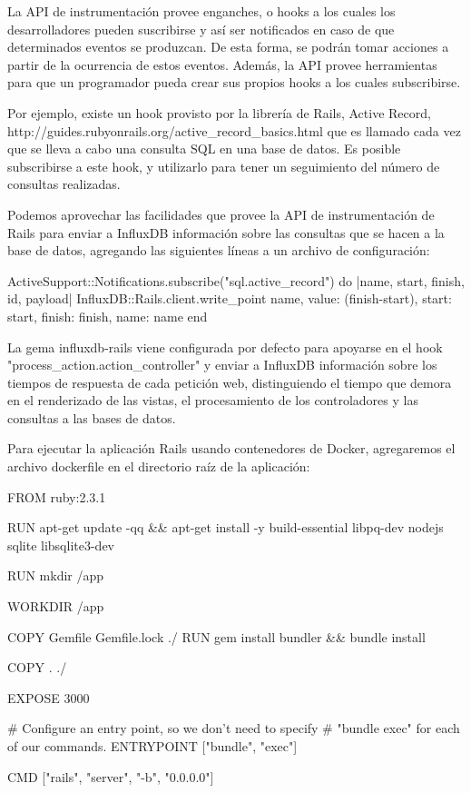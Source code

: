 La API de instrumentación provee enganches, o hooks a los cuales los desarrolladores pueden suscribirse y así ser notificados en caso de que determinados eventos se produzcan. De esta forma, se podrán tomar acciones a partir de la ocurrencia de estos eventos. Además, la API provee herramientas para que un programador pueda crear sus propios hooks a los cuales subscribirse.

Por ejemplo, existe un hook provisto por la librería de Rails, Active Record, http://guides.rubyonrails.org/active_record_basics.html que es llamado cada vez que se lleva a cabo una consulta SQL en una base de datos. Es posible subscribirse a este hook, y utilizarlo para tener un seguimiento del número de consultas realizadas.

Podemos aprovechar las facilidades que provee la API de instrumentación de Rails para enviar a InfluxDB información sobre las consultas que se hacen a la base de datos, agregando las siguientes líneas a un archivo de configuración:

ActiveSupport::Notifications.subscribe("sql.active_record") do |name, start, finish, id, payload|
  InfluxDB::Rails.client.write_point name,
    value: (finish-start),
    start: start,
    finish: finish,
    name: name
end

La gema influxdb-rails viene configurada por defecto para apoyarse en el hook "process_action.action_controller" y enviar a InfluxDB información sobre los tiempos de respuesta de cada petición web, distinguiendo el tiempo que demora en el renderizado de las vistas, el procesamiento de los controladores y las consultas a las bases de datos.

Para ejecutar la aplicación Rails usando contenedores de Docker, agregaremos el archivo dockerfile en el directorio raíz de la aplicación:

FROM ruby:2.3.1

RUN apt-get update -qq && apt-get install -y build-essential libpq-dev nodejs sqlite libsqlite3-dev

RUN mkdir /app

WORKDIR /app

COPY Gemfile Gemfile.lock ./
RUN gem install bundler && bundle install

COPY . ./

EXPOSE 3000

# Configure an entry point, so we don't need to specify 
# "bundle exec" for each of our commands.
ENTRYPOINT ["bundle", "exec"]

CMD ["rails", "server", "-b", "0.0.0.0"]

